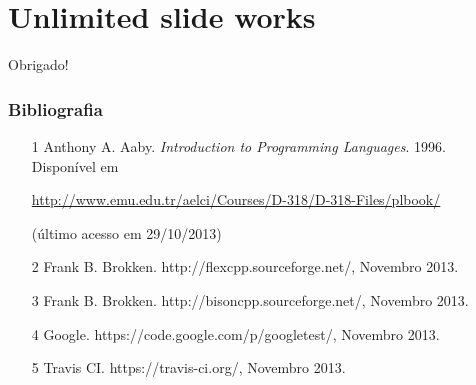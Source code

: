 \documentclass[brazil]{beamer}
\begin{document}
\section{Unlimited slide works}
\begin{frame}
  \begin{center}
    \LARGE Obrigado!
  \end{center}
\end{frame}
\begin{frame}
  \frametitle{Bibliografia}
  \begin{itemize}
    \footnotesize
    \item[1]
      Anthony A. Aaby. \textit{Introduction to Programming Languages}. 1996.
      Disponível em
      \begin{center}
        \scriptsize
        \url{http://www.emu.edu.tr/aelci/Courses/D-318/D-318-Files/plbook/}

        (último acesso em 29/10/2013)
      \end{center}
    \vspace{1em}
    \item[2]
      Frank B. Brokken. http://flexcpp.sourceforge.net/, Novembro 2013.
    \vspace{1em}
    \item[3]
      Frank B. Brokken. http://bisoncpp.sourceforge.net/, Novembro 2013.
    \vspace{1em}
    \item[4]
      Google. https://code.google.com/p/googletest/, Novembro 2013.
    \vspace{1em}
    \item[5]
      Travis CI. https://travis-ci.org/, Novembro 2013.
  \end{itemize}
\end{frame}
\end{document}
